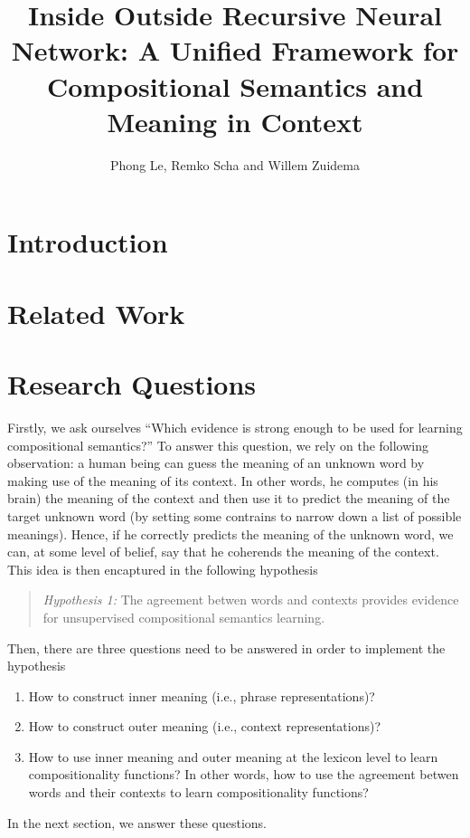 \documentclass[11pt]{article}
\title{Inside Outside Recursive Neural Network: A Unified Framework for 
Compositional Semantics and Meaning in Context}
\author{Phong Le, Remko Scha and Willem Zuidema}
\begin{document}
\maketitle

\section{Introduction}
\label{section introduction}

\section{Related Work}
\label{section introduction}

\section{Research Questions}
\label{section question}

Firstly, we ask ourselves ``Which evidence is strong enough to be used for 
learning compositional semantics?'' To answer this question, we rely on the 
following observation: a human being can guess the meaning of an unknown 
word by making use of the meaning of its context. In other words, he computes 
(in his brain) the meaning of the context and then use it to predict the meaning 
of the target unknown word (by setting some contrains to narrow down a list of 
possible meanings). Hence, if he correctly predicts the meaning of the unknown word, 
we can, at some level of belief, say that he coherends the meaning of the context. 
This idea is then encaptured in the following hypothesis
\begin{quote}
\textit{Hypothesis 1:} The agreement betwen words and contexts provides evidence for unsupervised 
compositional semantics learning. 
\end{quote}

Then, there are three questions need to be answered in order to implement the 
hypothesis
\begin{enumerate}
	\item How to construct inner meaning (i.e., phrase representations)?
	\item How to construct outer meaning (i.e., context representations)?
	\item How to use inner meaning and outer meaning at the lexicon level to learn 
	compositionality functions? In other words, how to use the agreement betwen words and 
	their contexts to learn compositionality functions?
\end{enumerate}
In the next section, we answer these questions.
\end{document}
